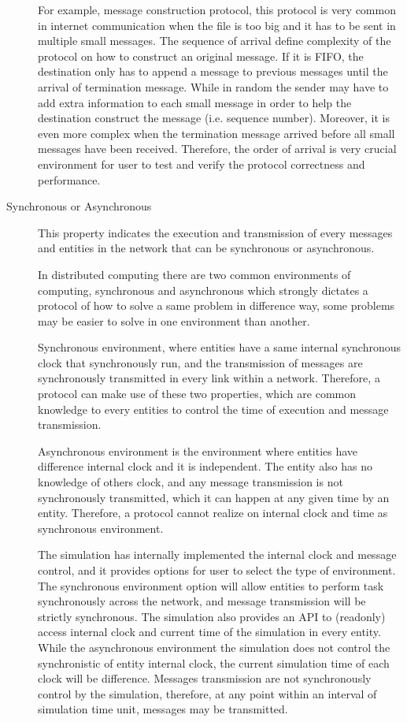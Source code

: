 \begin{description}
For example, message construction protocol, this protocol is very common in internet communication when the file is too big and it has to be sent in multiple small messages. The sequence of arrival define complexity of the protocol on how to construct an original message. If it is FIFO, the destination only has to append a message to previous messages until the arrival of termination message. While in random the sender may have to add extra information to each small message in order to help the destination construct the message (i.e. sequence number). Moreover, it is even more complex when the termination message arrived before all small messages have been received. Therefore, the order of arrival is very crucial environment for user to test and verify the protocol correctness and performance.


\item[Synchronous or Asynchronous]
This property indicates the execution and transmission of every messages and entities in the network that can be synchronous or asynchronous.

In distributed computing there are two common environments of computing, synchronous and asynchronous which strongly dictates a protocol of how to solve a same problem in difference way, some problems may be easier to solve in one environment than another.

Synchronous environment, where entities have a same internal synchronous clock that synchronously run, and the transmission of messages are synchronously transmitted in every link within a network. Therefore, a protocol can make use of these two properties, which are common knowledge to every entities to control the time of execution and message transmission.

Asynchronous environment is the environment where entities have difference internal clock and it is independent. The entity also has no knowledge of others clock, and any message transmission is not synchronously transmitted, which it can happen at any given time by an entity. Therefore, a protocol cannot realize on internal clock and time as synchronous environment.

The simulation has internally implemented the internal clock and message control, and it provides options for user to select the type of environment. The synchronous environment option will allow entities to perform task synchronously across the network, and message transmission will be strictly synchronous. The simulation also provides an API to (readonly) access internal clock and current time of the simulation in every entity.
While the asynchronous environment the simulation does not control the synchronistic of entity internal clock, the current simulation time of each clock will be difference. Messages transmission are not synchronously control by the simulation, therefore, at any point within an interval of simulation time unit, messages may be transmitted.


\end{description}
